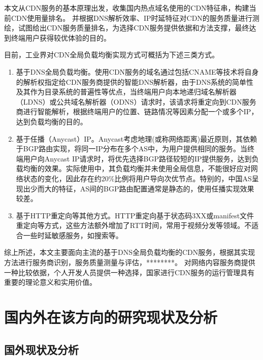 
本文从CDN服务的基本原理出发，收集国内热点域名使用的CDN特征串，构建当前CDN使用量排名。
并根据DNS解析效率、IP时延特征对CDN的服务质量进行测绘，试图给出CDN服务质量排名，为选择CDN服务提供依据和方法支撑，最终达到终端用户获得较优体验的目的。

目前，工业界对CDN全局负载均衡实现方式可概括为下述三类方式。


\begin{enumerate}[label={(\arabic*)}]
	
	
	\item 基于DNS全局负载均衡。使用CDN服务的域名通过包括CNAME等技术\cite{Choffnes2017}将自身的解析权指定给CDN服务商提供的智能DNS解析器，由于DNS系统的简单性及其作为目录系统的普遍性\cite{Pathan-survey-2007}等优点，当终端用户向本地递归域名解析器（LDNS）或公共域名解析器（ODNS）请求时，该请求将重定向到CDN服务商进行智能解析，根据终端用户的位置、链路情况等因素分配一个或多个IP，达到负载均衡的目的。
	\item 基于任播（Anycast）IP。Anycast考虑地理(或称网络距离)最近原则，其依赖于BGP路由实现，将同一IP分布在多个AS中，为用户提供相同的服务。当终端用户向Anycast IP请求时，将优先选择BGP路径较短的IP提供服务，达到负载均衡的效果。实际使用中，其负载均衡并未使用全局信息\cite{Calder2015}，不能很好应对网络状态的变化\cite{Choffnes2017}，因此存在约20\%比例将用户导向次优节点。特别的，中国AS呈现出少而大的特征，AS间的BGP路由配置通常是静态的\cite{Choffnes2017}，使用任播实现效果较差。
	\item 基于HTTP重定向等其他方式。HTTP重定向基于状态码3XX或manifest文件重定向\cite{Adhikari2014}等方式，这些方法额外增加了RTT时间，常用于视频分发等领域。不适合一些时延敏感服务，如搜索等。
	
	
\end{enumerate}

综上所述，本文主要面向主流\cite{Hao2018}的基于DNS全局负载均衡的CDN服务，根据其实现方法进行服务商识别，服务质量测量与评估，********。
对网络内容服务商提供一种比较依据，个人开发人员提供一种选择，国家进行CDN服务的运行管理具有重要的理论意义和实用价值。

\section{国内外在该方向的研究现状及分析}
\subsection{国外现状及分析}
